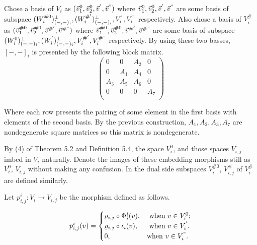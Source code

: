 \def\CTEXPreproc{Created by ctex v0.2.12, don't edit!}\documentclass[11pt]{article}
\begin{document}
  \begin{pf}
  Chose a basis of $ V_i $   as $( \vec{v}^0 _{1}, \vec{v}^0 _{2}, \vec{v}^{'} ,\vec{v}^{"}    )$ where  $\vec{v}^0 _{1}   , \vec{v}^0 _{2} , \vec{v}^{'}  ,\vec{v}^{"} $  are some basis of subspace $  (W^{\# 0}_i )^{\perp}_{(-,-)_i }, (W^{\# '}_i )^{\perp}_{(-,-)_i} ,
  V^{'}_i , V^{"}_i $  respectively.  Also chose a basis of $ V^{\#}_i $   as
  $( \vec{v}^{\# 0} _{1}, \vec{v}^{\# 0} _{2}, \vec{v}^{\# '} ,\vec{v}^{\# "}    )$ where  $\vec{v}^{\# 0} _{1}   , \vec{v}^{\# 0} _{2} , \vec{v}^{\# '}  ,\vec{v}^{\# "} $  are some basis of subspace $  (W^{ 0}_i )^{\perp}_{(-,-)_i }, (W^{ '}_i )^{\perp}_{(-,-)_i} ,
  V^{\# '}_i , V^{\# "}_i $  respectively. By using these two basses, $[-,-]_i$ is presented by the following block matrix.
  \[
  \left(
    \begin{array}{cccc}
      0 & 0 & A_2 & 0 \\
      0 & A_1 & A_4 & 0 \\
      A_3 & A_5 & A_6 & 0 \\
      0 & 0 & 0 & A_7 \\
    \end{array}
  \right)
  \]

  Where each row presents the pairing of some element in the first basis  with elements of the second basis. By the previous construction, $A_1 , A_2 , A_3 ,A_7$ are nondegenerate square matrices so this matrix is nondegenerate.\\
  \end{pf}






  By (4) of Theorem 5.2 and Definition 5.4, the space $V^0 _i$, and those spaces $V_{i,j}$ imbed  in $V_i$ naturally. Denote the images of these embedding morphisms still as  $V^0 _i$, $V_{i,j}$ without making any confusion.  In the dual side  subspaces $V^{\# 0} _i  $, $V^{\#}_{i,j }$ of $V^{\#}_i$ are defined similarly.


  Let $p^i _{i,j} : V_i \rightarrow V_{i,j} $ be the morphism  defined as follows.

   \[
p^i _{i,j} (v)= \begin{cases}
   \varrho _{i,j} \circ \bar{\Phi}^i _i  (v), & \text{ when $v\in V^0 _i$;} \\
    \varrho_{i,j} \circ \iota_i (v), & \text{ when $v\in V^{'} _i $.}\\
    0,& \text{when $v\in V^{"}_i $. }
\end{cases}
\]
\end{document}
